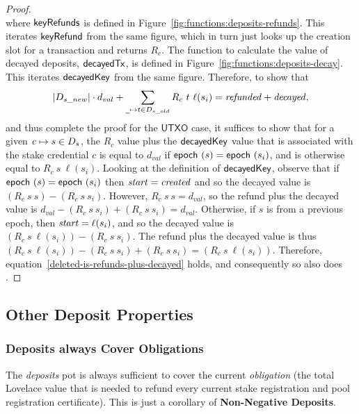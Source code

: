 \begin{proof}
\begin{equation*}
  \end{equation*}
  where $\mathsf{keyRefunds}$ is defined in Figure~\ref{fig:functions:deposits-refunds}.
  This iterates $\mathsf{keyRefund}$ from the same figure,
  which in turn just looks up the creation slot for a transaction and returns $R_c$.
  The function to calculate the value of decayed deposits, $\mathsf{decayedTx}$, is defined in Figure~\ref{fig:functions:deposits-decay}.
  This iterates $\mathsf{decayedKey}$ from the same figure.
  Therefore, to show that
  \begin{equation}\label{deleted-is-refunds-plus-decayed}
    |D_{s\_new}|\cdot d_{val} + \sum_{\wcard\mapsto t\in D_{s\_old}}R_c~t~\ell(s_i)
    = \var{refunded} + \var{decayed},
  \end{equation}
  and thus complete the proof for the $\mathsf{UTXO}$ case,
  it suffices to show that for a given $\mathit{c}\mapsto s\in D_s$,
  the $R_c$ value plus the $\mathsf{decayedKey}$ value that is associated with the stake
  credential $c$ is equal to $d_{val}$ if $\mathsf{epoch}~ \mathit{(}s)=\mathsf{epoch}~ \mathit{(}s_i)$, and is otherwise equal to $R_c~s~\ell(s_i)$.
  Looking at the definition of $\mathsf{decayedKey}$, observe that if $\mathsf{epoch}~ \mathit{(}s)=\mathsf{epoch}~ \mathit{(}s_i)$
  then $\mathit{start}=\mathit{created}$ and so the decayed value is $(R_c~s~s)-(R_c~s~s_i)$.
  However, $R_c~s~s = d_{val}$, so the refund plus the decayed value is
  $d_{val}-(R_c~s~s_i)+(R_c~s~s_i)=d_{val}$.
  Otherwise, if $s$ is from a previous epoch, then $\mathit{start}=\ell(s_i)$, and so
  the decayed value is $(R_c~s~\ell(s_i))-(R_c~s~s_i)$.
  The refund plus the decayed value is thus
  $(R_c~s~\ell(s_i))-(R_c~s~s_i)+(R_c~s~s_i)=(R_c~s~\ell(s_i))$.
  Therefore, equation~\ref{deleted-is-refunds-plus-decayed} holds, and
  consequently so also does .

\end{proof}

\subsection{Other Deposit Properties}

\subsubsection{Deposits always Cover Obligations}
 The \textit{deposits} pot is always sufficient to cover the current \emph{obligation}
(the total Lovelace value that is needed to refund every current stake registration and
pool registration certificate). 
%
%
This is just a corollary of \textbf{Non-Negative Deposits}.

